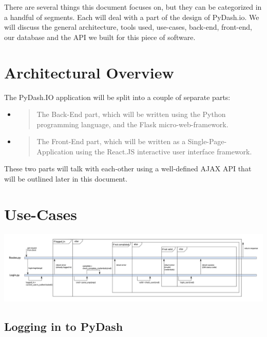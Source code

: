 There are several things this document focuses on, but they can be
categorized in a handful of segments. Each will deal with a part of the
design of PyDash.io. We will discuss the general architecture, tools
used, use-cases, back-end, front-end, our database and the API we built
for this piece of software.

\hypertarget{architectural-overview}{%
\section{Architectural Overview}\label{architectural-overview}}

The PyDash.IO application will be split into a couple of separate parts:

\begin{itemize}
\item
  \begin{quote}
  The Back-End part, which will be written using the Python programming
  language, and the Flask micro-web-framework.
  \end{quote}
\item
  \begin{quote}
  The Front-End part, which will be written as a Single-Page-Application
  using the React.JS interactive user interface framework.
  \end{quote}
\end{itemize}

These two parts will talk with each-other using a well-defined AJAX API
that will be outlined later in this document.

\hypertarget{use-cases}{%
\section{Use-Cases}\label{use-cases}}

\includegraphics[width=\pagewidth]{media/image26.png}


\hypertarget{logging-in-to-pydash}{%
\subsection{Logging in to PyDash}\label{logging-in-to-pydash}}

